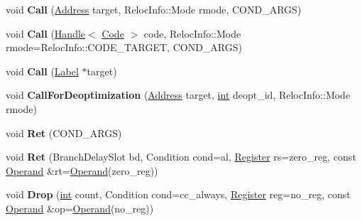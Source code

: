 \begin{DoxyCompactItemize}
void {\bfseries Call} (\mbox{\hyperlink{classuintptr__t}{Address}} target, Reloc\+Info\+::\+Mode rmode, C\+O\+N\+D\+\_\+\+A\+R\+GS)
\item 
\mbox{\label{classv8_1_1internal_1_1TurboAssembler_a75ce7a3fea525aec019f52dd6b313c53}} 
void {\bfseries Call} (\mbox{\hyperlink{classv8_1_1internal_1_1Handle}{Handle}}$<$ \mbox{\hyperlink{classv8_1_1internal_1_1Code}{Code}} $>$ code, Reloc\+Info\+::\+Mode rmode=Reloc\+Info\+::\+C\+O\+D\+E\+\_\+\+T\+A\+R\+G\+ET, C\+O\+N\+D\+\_\+\+A\+R\+GS)
\item 
\mbox{\label{classv8_1_1internal_1_1TurboAssembler_a76c1a7002369fba1c520446e9e4cfc34}} 
void {\bfseries Call} (\mbox{\hyperlink{classv8_1_1internal_1_1Label}{Label}} $\ast$target)
\item 
\mbox{\label{classv8_1_1internal_1_1TurboAssembler_a8fe9aeaba65f21a5f48bbf9ad66fa18d}} 
void {\bfseries Call\+For\+Deoptimization} (\mbox{\hyperlink{classuintptr__t}{Address}} target, \mbox{\hyperlink{classint}{int}} deopt\+\_\+id, Reloc\+Info\+::\+Mode rmode)
\item 
\mbox{\label{classv8_1_1internal_1_1TurboAssembler_a008314469be8d53c0f842461b0ab8f8d}} 
void {\bfseries Ret} (C\+O\+N\+D\+\_\+\+A\+R\+GS)
\item 
\mbox{\label{classv8_1_1internal_1_1TurboAssembler_acd0f108dfaa849e84d807d8d70d2ea88}} 
void {\bfseries Ret} (Branch\+Delay\+Slot bd, Condition cond=al, \mbox{\hyperlink{classv8_1_1internal_1_1Register}{Register}} rs=zero\+\_\+reg, const \mbox{\hyperlink{classv8_1_1internal_1_1Operand}{Operand}} \&rt=\mbox{\hyperlink{classv8_1_1internal_1_1Operand}{Operand}}(zero\+\_\+reg))
\item 
\mbox{\label{classv8_1_1internal_1_1TurboAssembler_a8b83cbfc7502c2a8f2787a538868175c}} 
void {\bfseries Drop} (\mbox{\hyperlink{classint}{int}} count, Condition cond=cc\+\_\+always, \mbox{\hyperlink{classv8_1_1internal_1_1Register}{Register}} reg=no\+\_\+reg, const \mbox{\hyperlink{classv8_1_1internal_1_1Operand}{Operand}} \&op=\mbox{\hyperlink{classv8_1_1internal_1_1Operand}{Operand}}(no\+\_\+reg))

\end{DoxyCompactItemize}
